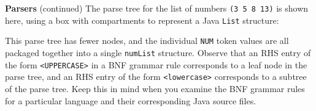 \begin{minipage}[t]{\sw}
\slidenumber
\LARGE
{\bf Parsers} (continued)\exx
\Large
\emm\LightBox{\MYlonGrammarKleene}\exx
\LARGE
The parse tree for the list of numbers \verb'(3 5 8 13)' is shown here,
using a box with compartments to represent a Java \verb'List' structure:\exx
\centerline{}\exx
This parse tree has fewer nodes,
and the individual \verb'NUM' token values
are all packaged together into a single \verb'numList' structure.\exx
Observe that an RHS entry of the form \verb'<UPPERCASE>'
in a BNF grammar rule corresponds
to a leaf node in the parse tree,
and an RHS entry of the form \verb'<lowercase>' corresponds
to a subtree of the parse tree.
Keep this in mind when you examine the BNF grammar rules
for a particular language
and their corresponding Java source files.
\end{minipage}
\clearpage
